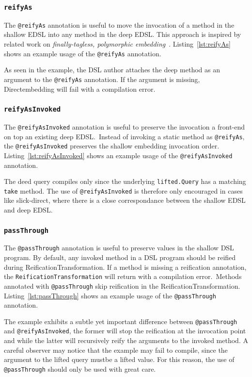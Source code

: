 \subsubsection{\texttt{reifyAs}} %
\label{sub:reifyAs}
The \texttt{@reifyAs} annotation is useful to move the invocation of a method in the shallow EDSL into any method in the deep EDSL.
This approach is inspired by related work on \emph{finally-tagless, polymorphic embedding}~\autocite{carette_finally_2009,hofer_polymorphic_2008}.
Listing~\ref{lst:reifyAs} shows an example usage of the \texttt{@reifyAs} annotation.

As seen in the example, the DSL author attaches the deep method as an argument to the \texttt{@reifyAs} annotation.
If the argument is missing, Directembedding will fail with a compilation error.

\subsubsection{\texttt{reifyAsInvoked}} %
\label{sub:reifyAsInvoked}
The \texttt{@reifyAsInvoked} annotation is useful to preserve the invocation a front-end on top an existing deep EDSL.\
Instead of invoking a static method as \texttt{@reifyAs}, the \texttt{@reifyAsInvoked} preserves the shallow embedding invocation order.
Listing~\ref{lst:reifyAsInvoked} shows an example usage of the \texttt{@reifyAsInvoked} annotation.

The deed query compiles only since the underlying \texttt{lifted.Query} has a matching \texttt{take} method.
The use of \texttt{@reifyAsInvoked} is therefore only encouraged in cases like slick-direct, where there is a close correspondance between the shallow EDSL and deep EDSL.

\subsubsection{\texttt{passThrough}} %
\label{sub:passThrough}
The \texttt{@passThrough} annotation is useful to preserve values in the shallow DSL program.
By default, any invoked method in a DSL program should be reified during ReificationTransformation.
If a method is missing a reification annotation, the \texttt{ReificationTransformation} will return with a compilation error.\
Methods annotated with \texttt{@passThrough} skip reification in the ReificationTransformation.
Listing~\ref{lst:passThrough} shows an example usage of the \texttt{@passThrough} annotation.

The example exhibits a subtle yet important difference between \texttt{@passThrough} and \texttt{@reifyAsInvoked}, the former will stop the reification at the invocation point and while the latter will recursively reify the arguments to the invoked method.
A careful observer may notice that the example may fail to compile, since the argument to the lifted query mustbe a lifted value.
For this reason, the use of \texttt{@passThrough} should only be used with great care.

